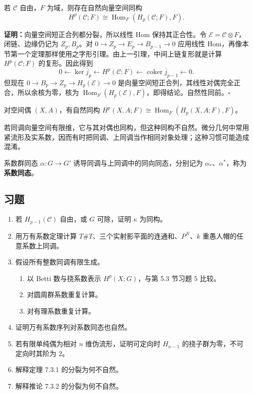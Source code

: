 若 $\mathcal C$ 自由，$F$ 为域，则存在自然向量空间同构
\[
H^p(\mathcal C;F)\cong\operatorname{Hom}_F(H_p(\mathcal C;F),F).
\]

\textbf{证明：}向量空间短正合列都分裂，所以线性 Hom 保持其正合性。令 $\mathcal E=\mathcal C\otimes F$，闭链、边缘仍记为 $Z_p,B_p$。对 $0\to Z_p\to E_p\to B_{p-1}\to0$ 应用线性 Hom，再像本节第一个定理那样使用之字形引理。由上一引理，中间上链复形就是计算 $H^p(\mathcal C;F)$ 的复形。因此得到
\[
0\leftarrow\ker\overline j_p\leftarrow H^p(\mathcal C;F)\leftarrow\operatorname{coker}\overline j_{p-1}\leftarrow0.
\]
但现在 $0\to B_p\to Z_p\to H_p(\mathcal E)\to0$ 是向量空间短正合列，其线性对偶完全正合，所以余核为零，核为 $\operatorname{Hom}_F(H_p(\mathcal E),F)$，即得结论。自然性同前。\hfill$\square$

对空间偶 $(X,A)$，有自然同构 $H^p(X,A;F)\cong\operatorname{Hom}_F(H_p(X,A;F),F)$。

若同调向量空间有限维，它与其对偶也同构，但这种同构不自然。微分几何中常用紧流形及实系数，因而有时把同调、上同调当作相同对象处理；这种习惯可能造成混淆。

系数群同态 $\alpha:G\to G'$ 诱导同调与上同调中的同向同态，分别记为 $\alpha_*$、$\alpha^*$，称为\textbf{系数同态}。

\subsection*{习题}
\begin{enumerate}
\item 若 $H_{p-1}(\mathcal C)$ 自由，或 $G$ 可除，证明 $\kappa$ 为同构。
\item 用万有系数定理计算 $T\#T$、三个实射影平面的连通和、$P^N$、$k$ 重愚人帽的任意系数上同调。
\item 假设所有整数同调有限生成。
\begin{enumerate}[label=(\alph*)]
\item 以 Betti 数与挠系数表示 $H^p(X;G)$，与第 5.3 节习题 5 比较。
\item 对圆周群系数重复计算。
\item 对有理系数重复计算。
\end{enumerate}
\item 证明万有系数序列对系数同态也自然。
\item 若有限单纯偶为相对 $n$ 维伪流形，证明可定向时 $H_{n-1}$ 的挠子群为零，不可定向时其阶为 $2$。
\item 解释定理 7.3.1 的分裂为何不自然。
\item 解释推论 7.3.2 的分裂为何不自然。
\end{enumerate}
